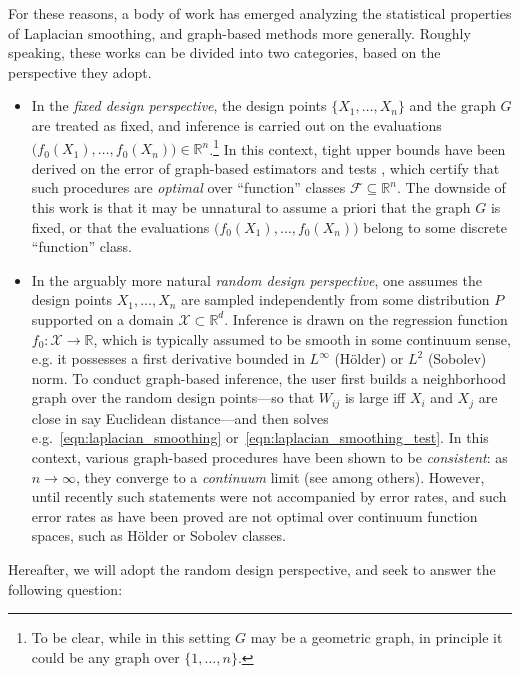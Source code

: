 \documentclass[twoside]{article}
\newcommand{\Reals}{\mathbb{R}}
\newcommand{\1}{\mathbf{1}}
\newcommand{\Rd}{\Reals^d}
\newcommand{\Xset}{\mathcal{X}}
\newcommand{\Leb}{L}
\newcommand{\mc}[1]{\mathcal{#1}}
\theoremstyle{definition}
\theoremstyle{remark}
\begin{document}
For these reasons, a body of work has emerged analyzing the statistical properties of Laplacian smoothing, and graph-based methods more generally. Roughly speaking, these works can be divided into two categories, based on the perspective they adopt. 
\begin{itemize}
	\item In the \emph{fixed design perspective}, the design points $\{X_1,\ldots,X_n\}$ and the graph $G$ are treated as fixed, and inference is carried out on the evaluations $\bigl(f_0(X_1),\ldots,f_0(X_n)\bigr) \in \Reals^n$.\footnote{To be clear, while in this setting $G$ may be a geometric graph, in principle it could be any graph over $\{1,\ldots,n\}$.} In this context, tight upper bounds have been derived on the error of graph-based estimators \citep{wang2016, sadhanala16,sadhanala17,kirichenko2017,kirichenko2018} and tests \citep{sharpnack2013,sharpnack2013b,sharpnack2015}, which certify that such procedures are \emph{optimal} over ``function'' classes $\mc{F} \subseteq \Reals^n$. The downside of this work is that it may be unnatural to assume a priori that the graph $G$ is fixed, or that the evaluations $\bigl(f_0(X_1),\ldots,f_0(X_n)\bigr)$ belong to some discrete ``function'' class.
	\item In the arguably more natural \emph{random design perspective},  one assumes the design points $X_1,\ldots,X_n$ are sampled independently from some distribution $P$ supported on a domain $\Xset \subset \Rd$. Inference is drawn on the regression function $f_0: \Xset \to \Reals$, which is typically assumed to be smooth in some continuum sense, e.g. it possesses a first derivative bounded in $L^{\infty}$ (H\"{o}lder) or $\Leb^2$ (Sobolev) norm. To conduct graph-based inference, the user first builds a neighborhood graph over the random design points---so that $W_{ij}$ is large iff $X_i$ and $X_j$ are close in say Euclidean distance---and then solves e.g.~\eqref{eqn:laplacian_smoothing} or~\eqref{eqn:laplacian_smoothing_test}. In this context, various graph-based procedures have been shown to be \emph{consistent}: as $n \to \infty$, they converge to a \emph{continuum} limit (see \citep{belkin07,trillos2018,vonluxburg2008} among others). However, until recently such statements were not accompanied by error rates, and such error rates as have been proved \citep{lee2016,trillos2020} are not optimal over continuum function spaces, such as H\"{o}lder or Sobolev classes. 
\end{itemize}
Hereafter, we will adopt the random design perspective, and seek to answer the following question:
\end{document}
